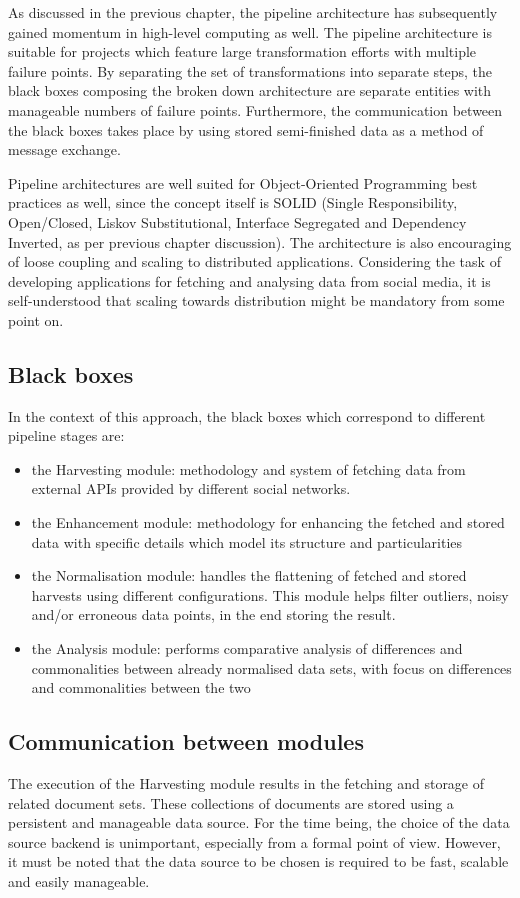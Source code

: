 As discussed in the previous chapter, the pipeline architecture has subsequently gained momentum in high-level computing as well. The pipeline architecture is suitable for projects which feature large transformation efforts with multiple failure points. By separating the set of transformations into separate steps, the black boxes composing the broken down architecture are separate entities with manageable numbers of failure points. Furthermore, the communication between the black boxes takes place by using stored semi-finished data as a method of message exchange.

Pipeline architectures are well suited for Object-Oriented Programming best practices as well, since the concept itself is SOLID (Single Responsibility, Open/Closed, Liskov Substitutional, Interface Segregated and Dependency Inverted, as per previous chapter discussion). The architecture is also encouraging of loose coupling and scaling to distributed applications. Considering the task of developing applications for fetching and analysing data from social media, it is self-understood that scaling towards distribution might be mandatory from some point on.

\subsection{Black boxes}
In the context of this approach, the black boxes which correspond to different pipeline stages are:

\begin{itemize}
\item the Harvesting module: methodology and system of fetching data from external APIs provided by different social networks.
\item the Enhancement module: methodology for enhancing the fetched and stored data with specific details which model its structure and particularities
\item the Normalisation module: handles the flattening of fetched and stored harvests using different configurations. This module helps filter outliers, noisy and/or erroneous data points, in the end storing the result.
\item the Analysis module: performs comparative analysis of differences and commonalities between already normalised data sets, with focus on differences and commonalities between the two
\end{itemize}

\subsection{Communication between modules}
The execution of the Harvesting module results in the fetching and storage of related document sets. These collections of documents are stored using a persistent and manageable data source. For the time being, the choice of the data source backend is unimportant, especially from a formal point of view. However, it must be noted that the data source to be chosen is required to be fast, scalable and easily manageable.

